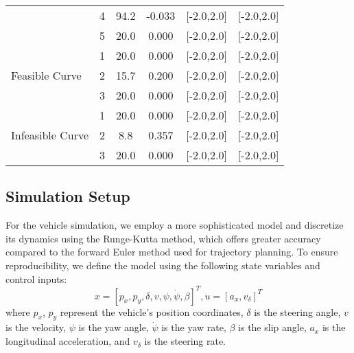 \begin{longtable}{l c c c c c}
	                                  & 4                & 94.2            & -0.033             & [-2.0,2.0]                              & [-2.0,2.0]   \\
	                                  & 5                & 20.0            & 0.000              & [-2.0,2.0]                              & [-2.0,2.0]   \\
	\midrule
	\multirow{3}{*}{Feasible Curve}   & 1                & 20.0            & 0.000              & [-2.0,2.0]                              & [-2.0,2.0]   \\
	                                  & 2                & 15.7            & 0.200              & [-2.0,2.0]                              & [-2.0,2.0]   \\
	                                  & 3                & 20.0            & 0.000              & [-2.0,2.0]                              & [-2.0,2.0]   \\
	\midrule
	\multirow{3}{*}{Infeasible Curve} & 1                & 20.0            & 0.000              & [-2.0,2.0]                              & [-2.0,2.0]   \\
	                                  & 2                & 8.8             & 0.357              & [-2.0,2.0]                              & [-2.0,2.0]   \\
	                                  & 3                & 20.0            & 0.000              & [-2.0,2.0]                              & [-2.0,2.0]   \\
	\midrule
\end{longtable}

\subsection{Simulation Setup} \label{subsec:simulation}

For the vehicle simulation, we employ a more sophisticated model and discretize its dynamics using the Runge-Kutta method, which offers greater
accuracy compared to the forward Euler method used for trajectory planning.
To ensure reproducibility, we define the model using the following state variables and control inputs: \[ x = [p_x, p_y, \delta, v, \psi, \dot{\psi},
	\beta]^T, u = [a_x, v_{\delta}]^T \] where $p_x$, $p_y$ represent the vehicle's position coordinates, $\delta$ is the steering angle, $v$ is the
velocity, $\psi$ is the yaw angle, $\dot{\psi}$ is the yaw rate, $\beta$ is the slip angle, $a_x$ is the longitudinal acceleration, and $v_\delta$ is
the steering rate.

